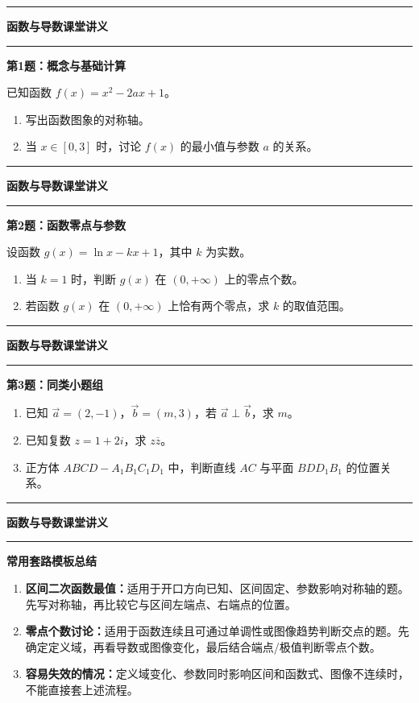 \documentclass[12pt,a4paper]{ctexart}
\newcommand{\lessonTitle}[2]{
  \begin{center}
    {\LARGE\bfseries #1}
  \end{center}
  \vspace{0.2em}
  \hrule
  \vspace{0.8em}
}
\newcommand{\questionBox}[2]{
  \textbf{\large #1}

  \vspace{0.25em}
  #2
  \vspace{0.45em}
  \hrule
}
\newcommand{\writeArea}[1]{
  \vspace{0.75em}
  \vspace*{#1cm}
}
\begin{document}
\hrule

\newpage
\lessonTitle{函数与导数课堂讲义}{}

\questionBox{第1题：概念与基础计算}{
已知函数 $f(x)=x^2-2ax+1$。
\begin{enumerate}
  \item 写出函数图象的对称轴。
  \item 当 $x\in[0,3]$ 时，讨论 $f(x)$ 的最小值与参数 $a$ 的关系。
\end{enumerate}
}

\writeArea{15.4}

\newpage
\lessonTitle{函数与导数课堂讲义}{}

\questionBox{第2题：函数零点与参数}{
设函数 $g(x)=\ln x-kx+1$，其中 $k$ 为实数。
\begin{enumerate}
  \item 当 $k=1$ 时，判断 $g(x)$ 在 $(0,+\infty)$ 上的零点个数。
  \item 若函数 $g(x)$ 在 $(0,+\infty)$ 上恰有两个零点，求 $k$ 的取值范围。
\end{enumerate}
}

\vspace{0.5em}
\begin{center}
\end{center}

\writeArea{10.7}

\newpage
\lessonTitle{函数与导数课堂讲义}{}

\questionBox{第3题：同类小题组}{
\begin{enumerate}
  \item 已知 $\vec a=(2,-1)$，$\vec b=(m,3)$，若 $\vec a\perp \vec b$，求 $m$。
  \item 已知复数 $z=1+2i$，求 $z\overline z$。
  \item 正方体 $ABCD-A_1B_1C_1D_1$ 中，判断直线 $AC$ 与平面 $BDD_1B_1$ 的位置关系。
\end{enumerate}
}

\writeArea{15.3}

\newpage
\lessonTitle{函数与导数课堂讲义}{}

\textbf{\large 常用套路模板总结}

\vspace{0.3em}
\begin{enumerate}
  \item \textbf{区间二次函数最值：}适用于开口方向已知、区间固定、参数影响对称轴的题。先写对称轴，再比较它与区间左端点、右端点的位置。
  \item \textbf{零点个数讨论：}适用于函数连续且可通过单调性或图像趋势判断交点的题。先确定定义域，再看导数或图像变化，最后结合端点/极值判断零点个数。
  \item \textbf{容易失效的情况：}定义域变化、参数同时影响区间和函数式、图像不连续时，不能直接套上述流程。
\end{enumerate}
\end{document}
